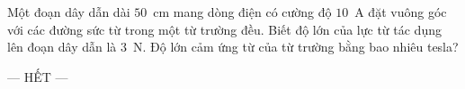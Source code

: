	\begin{ex}%
		Một đoạn dây dẫn dài $50$~cm mang dòng điện có cường độ $10$~A đặt vuông góc với các đường sức từ trong một từ trường đều. Biết độ lớn của lực từ tác dụng lên đoạn dây dẫn là $3$~N. Độ lớn cảm ứng từ của từ trường bằng bao nhiêu tesla?
		\par
	\end{ex}

	\centerline{--- HẾT ---}


